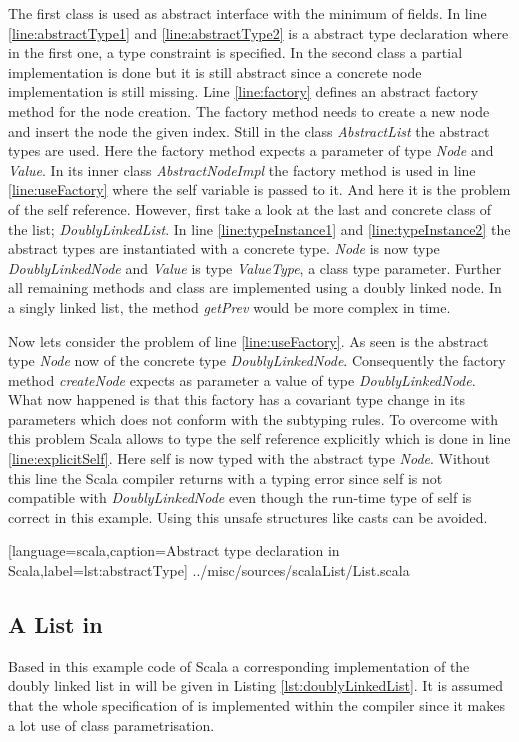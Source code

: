 The first class is used as abstract interface with the minimum of fields.
In line \ref{line:abstractType1} and \ref{line:abstractType2} is a
abstract type declaration where in the first one, a type constraint is
specified. In the second class a partial implementation is done but it is
still abstract since a concrete node implementation is still missing. Line
\ref{line:factory} defines an abstract factory method for the node
creation. The factory method needs to create a new node and insert the
node the given index. Still in the class \emph{AbstractList} the abstract
types are used. Here the factory method expects a parameter of type
\emph{Node} and \emph{Value}. In its inner class \emph{AbstractNodeImpl}
the factory method is used in line \ref{line:useFactory} where the
self variable is passed to it. And here it is the problem of the self
reference. However, first take a look at the last and concrete class
of the list; \emph{DoublyLinkedList}. In line \ref{line:typeInstance1}
and \ref{line:typeInstance2} the abstract types are instantiated with
a concrete type. \emph{Node} is now type \emph{DoublyLinkedNode} and
\emph{Value} is type \emph{ValueType}, a class type parameter. Further all
remaining methods and class are implemented using a doubly linked node.
In a singly linked list, the method \emph{getPrev} would be more complex
in time.

Now lets consider the problem of line \ref{line:useFactory}. As
seen is the abstract type \emph{Node} now of the concrete
type \emph{DoublyLinkedNode}. Consequently the factory
method \emph{createNode} expects as parameter a value of type
\emph{DoublyLinkedNode}. What now happened is that this factory has a
covariant type change in its parameters which does not conform with the
subtyping rules. To overcome with this problem Scala allows to type the
self reference explicitly which is done in line \ref{line:explicitSelf}.
Here self is now typed with the abstract type \emph{Node}. Without this
line the Scala compiler returns with a typing error since self is not
compatible with \emph{DoublyLinkedNode} even though the run-time
type of self is correct in this example. Using this unsafe structures
like casts can be avoided.


[language=scala,caption=Abstract type declaration in Scala,label=lst:abstractType]
{../misc/sources/scalaList/List.scala}

\subsection{A List in \ooplss}
Based in this example code of Scala a corresponding implementation
of the doubly linked list in \ooplss will be given in Listing
\ref{lst:doublyLinkedList}. It is assumed that the whole specification
of \ooplss is implemented within the compiler since it makes a lot use
of class parametrisation.


